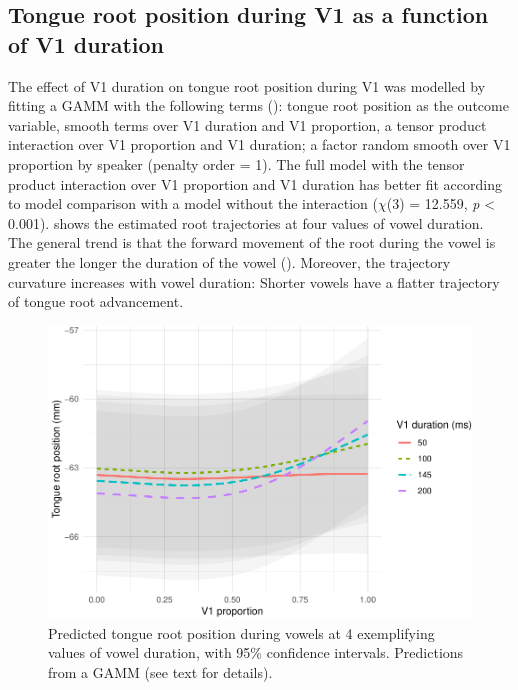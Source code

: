 \documentclass[12pt,]{article}
\begin{document}
\hypertarget{tongue-root-position-during-v1-as-a-function-of-v1-duration}{%
\subsection{Tongue root position during V1 as a function of V1
duration}\label{tongue-root-position-during-v1-as-a-function-of-v1-duration}}

\label{s:trp-v1-dur}

The effect of V1 duration on tongue root position during V1 was modelled
by fitting a GAMM with the following terms
(): tongue root position as the outcome
variable, smooth terms over V1 duration and V1 proportion, a tensor
product interaction over V1 proportion and V1 duration; a factor random
smooth over V1 proportion by speaker (penalty order = 1). The full model
with the tensor product interaction over V1 proportion and V1 duration
has better fit according to model comparison with a model without the
interaction (\(\chi\)(3) = 12.559, \emph{p} \textless{} 0.001).
 shows the estimated root trajectories at four
values of vowel duration. The general trend is that the forward movement
of the root during the vowel is greater the longer the duration of the
vowel (). Moreover, the trajectory curvature
increases with vowel duration: Shorter vowels have a flatter trajectory
of tongue root advancement.

\begin{figure}
\includegraphics[width=\linewidth]{2018-tra_files/figure-latex/tra-gam-2-plot-1} \caption{Predicted tongue root position during vowels at 4 exemplifying values of vowel duration, with 95\% confidence intervals. Predictions from a GAMM (see text for details).}\label{f:tra-gam-2-plot}
\end{figure}
\end{document}
